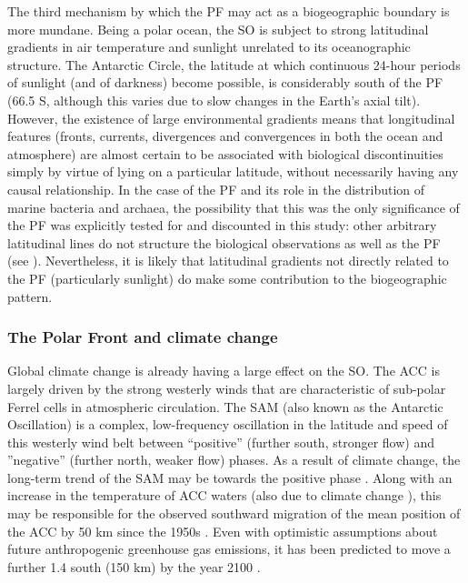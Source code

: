 The third mechanism by which the \ac{PF} may act as a biogeographic boundary is more mundane.
Being a polar ocean, the \ac{SO} is subject to strong latitudinal gradients in air temperature and sunlight unrelated to its oceanographic structure.
The Antarctic Circle, the latitude at which continuous 24-hour periods of sunlight (and of darkness) become possible, is considerably south of the \ac{PF} (\textapprox{}66.5\textdegree{} S, although this varies due to slow changes in the Earth's axial tilt).
However, the existence of large environmental gradients means that longitudinal features (fronts, currents, divergences and convergences in both the ocean and atmosphere) are almost certain to be associated with biological discontinuities simply by virtue of lying on a particular latitude, without necessarily having any causal relationship.
In the case of the \ac{PF} and its role in the distribution of marine bacteria and archaea, the possibility that this was the only significance of the \ac{PF} was explicitly tested for and discounted in this study: other arbitrary latitudinal lines do not structure the biological observations as well as the \ac{PF} (see ).
Nevertheless, it is likely that latitudinal gradients not directly related to the \ac{PF} (particularly sunlight) do make some contribution to the biogeographic pattern.

\subsubsection{The Polar Front and climate change}

Global climate change is already having a large effect on the \ac{SO}.
The \ac{ACC} is largely driven by the strong westerly winds that are characteristic of sub-polar Ferrel cells in atmospheric circulation.
The \ac{SAM} (also known as the Antarctic Oscillation) is a complex, low-frequency oscillation in the latitude and speed of this westerly wind belt between ``positive'' (further south, stronger flow) and ''negative'' (further north, weaker flow) phases.
As a result of climate change, the long-term trend of the \ac{SAM} may be towards the positive phase \cite{Thompson:2002ic}.
Along with an increase in the temperature of \ac{ACC} waters (also due to climate change \cite{Aoki:2003fo,Boning:2008il}), this may be responsible for the observed southward migration of the mean position of the \ac{ACC} by \textapprox{}50 km since the 1950s \cite{Gille:2002fr}.
Even with optimistic assumptions about future anthropogenic greenhouse gas emissions, it has been predicted to move a further \textapprox{}1.4\textdegree{} south (\textapprox{}150 km) by the year 2100 \cite{Fyfe:2005vp}.

